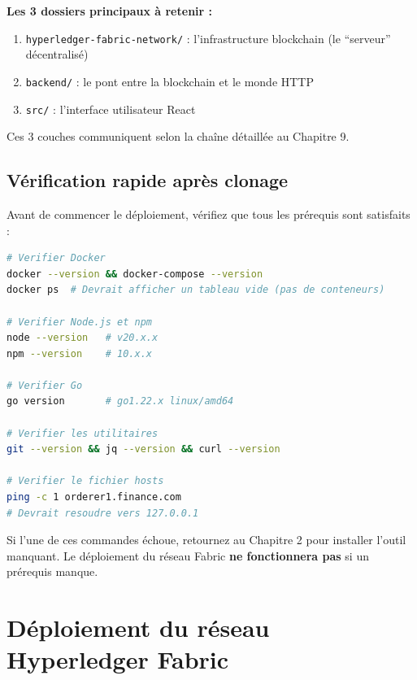\documentclass[12pt,a4paper,twoside]{report}
\begin{document}
\begin{tipbox}
\textbf{Les 3 dossiers principaux à retenir :}
\begin{enumerate}
    \item \texttt{hyperledger-fabric-network/} : l'infrastructure blockchain (le ``serveur'' décentralisé)
    \item \texttt{backend/} : le pont entre la blockchain et le monde HTTP
    \item \texttt{src/} : l'interface utilisateur React
\end{enumerate}
Ces 3 couches communiquent selon la chaîne détaillée au Chapitre 9.
\end{tipbox}

\section{Vérification rapide après clonage}

Avant de commencer le déploiement, vérifiez que tous les prérequis sont satisfaits :

\begin{lstlisting}[language=bash, caption=Script de vérification des prérequis]
# Verifier Docker
docker --version && docker-compose --version
docker ps  # Devrait afficher un tableau vide (pas de conteneurs)

# Verifier Node.js et npm
node --version   # v20.x.x
npm --version    # 10.x.x

# Verifier Go
go version       # go1.22.x linux/amd64

# Verifier les utilitaires
git --version && jq --version && curl --version

# Verifier le fichier hosts
ping -c 1 orderer1.finance.com
# Devrait resoudre vers 127.0.0.1
\end{lstlisting}

\begin{dangerbox}
Si l'une de ces commandes échoue, retournez au Chapitre 2 pour installer l'outil manquant. Le déploiement du réseau Fabric \textbf{ne fonctionnera pas} si un prérequis manque.
\end{dangerbox}


\chapter{Déploiement du réseau Hyperledger Fabric}
\end{document}
